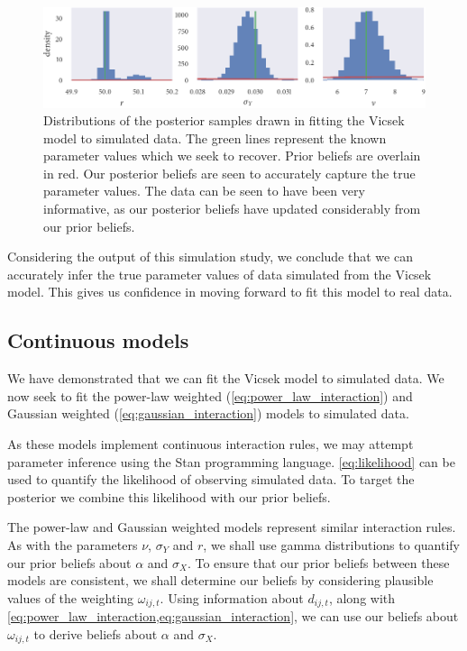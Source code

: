 \begin{figure}[tbp]
  \includegraphics{r_hist.pdf}
  \caption{Distributions of the posterior samples drawn in fitting the Vicsek
    model to simulated data. The green lines represent the known parameter
    values which we seek to recover. Prior beliefs are overlain in red. Our
    posterior beliefs are seen to accurately capture the true parameter
    values. The data can be seen to have been very informative, as our posterior
    beliefs have updated considerably from our prior beliefs.}
  \label{fig:vicsek_hist}
\end{figure}

Considering the output of this simulation study, we conclude that we can
accurately infer the true parameter values of data simulated from the Vicsek
model. This gives us confidence in moving forward to fit this model to real
data.

\subsection{Continuous models}
\label{ssec:continuous_models}

We have demonstrated that we can fit the Vicsek model to simulated data. We
now seek to fit the power-law weighted (\cref{eq:power_law_interaction}) and
Gaussian weighted (\cref{eq:gaussian_interaction}) models to simulated data.

As these models implement continuous interaction rules, we may attempt
parameter inference using the Stan programming language. \cref{eq:likelihood}
can be used to quantify the likelihood of observing simulated data. To target
the posterior we combine this likelihood with our prior beliefs.

The power-law and Gaussian weighted models represent similar interaction rules.
As with the parameters $\nu$, $\sigma_Y$ and $r$, we shall use gamma
distributions to quantify our prior beliefs about $\alpha$ and $\sigma_X$. To
ensure that our prior beliefs between these models are consistent, we shall
determine our beliefs by considering plausible values of the weighting
$\omega_{ij,t}$. Using information about $d_{ij,t}$, along with
\cref{eq:power_law_interaction,eq:gaussian_interaction}, we can use our beliefs
about $\omega_{ij,t}$ to derive beliefs about $\alpha$ and $\sigma_X$.

